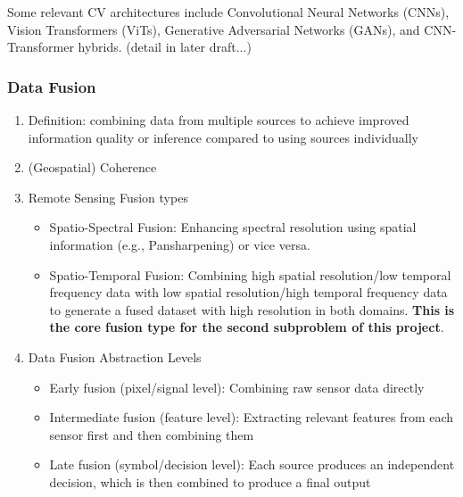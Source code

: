 \begin{multicols}{2}
Some relevant CV architectures include Convolutional Neural Networks (CNNs), Vision Transformers (ViTs), Generative Adversarial Networks (GANs), and CNN-Transformer hybrids. (detail in later draft...)

\subsubsection{Data Fusion}

\begin{enumerate}
    \item Definition: combining data from multiple sources to achieve improved information quality or inference compared to using sources individually\cite{Castanedo_trad_data_fusion_2013} 
    \item (Geospatial) Coherence\cite{Ghamisi_Multisource_and_Multitemporal_Data_Fusion_in_Remote_Sensing_2019}
    \item Remote Sensing Fusion types\cite{Ghamisi_Multisource_and_Multitemporal_Data_Fusion_in_Remote_Sensing_2019}\cite{Li_DL_multimodal_RS_data_fusion_review_2022}
    \begin{itemize}
        \item Spatio-Spectral Fusion: Enhancing spectral resolution using spatial information (e.g., Pansharpening) or vice versa.\cite{Ghamisi_Multisource_and_Multitemporal_Data_Fusion_in_Remote_Sensing_2019}\cite{Zhang_panchromatic_and_msi_fusion_for_RS_and_EO_2023}
        \item Spatio-Temporal Fusion: Combining high spatial resolution/low temporal frequency data with low spatial resolution/high temporal frequency data to generate a fused dataset with 
        high resolution in both domains.\cite{Ghamisi_Multisource_and_Multitemporal_Data_Fusion_in_Remote_Sensing_2019} \textbf{This is the core fusion type for the second subproblem of this project}. 
    \end{itemize}
    \item Data Fusion Abstraction Levels\cite{Hussain_DL_Data_Fusion_review_2024}
    \begin{itemize}
        \item Early fusion (pixel/signal level): Combining raw sensor data directly 
        \item Intermediate fusion (feature level): Extracting relevant features from each sensor first and then combining them
        \item Late fusion (symbol/decision level): Each source produces an independent decision, which is then combined to produce a final output

\end{itemize}
\end{enumerate}
\end{multicols}

